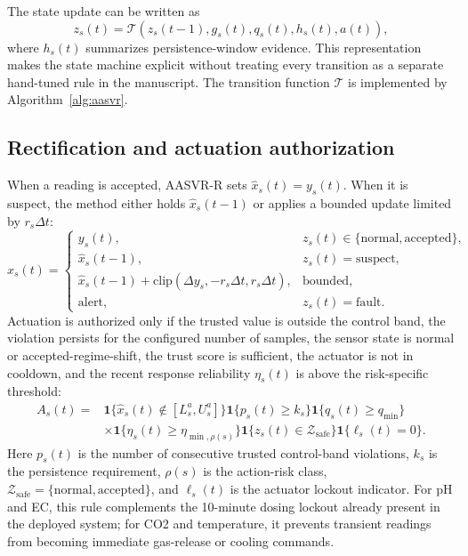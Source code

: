 \documentclass[preprint,12pt,doubleblind]{elsarticle}
\begin{document}
The state update can be written as
\begin{equation}
z_s(t)=\mathcal{T}\left(z_s(t-1),g_s(t),q_s(t),h_s(t),a(t)\right),
\end{equation}
where $h_s(t)$ summarizes persistence-window evidence. This representation makes the state machine explicit without treating every transition as a separate hand-tuned rule in the manuscript. The transition function $\mathcal{T}$ is implemented by Algorithm~\ref{alg:aasvr}.

\subsection{Rectification and actuation authorization}
When a reading is accepted, AASVR-R sets $\hat{x}_s(t)=y_s(t)$. When it is suspect, the method either holds $\hat{x}_s(t-1)$ or applies a bounded update limited by $r_s\Delta t$:
\begin{equation}
\hat{x}_s(t)=
\begin{cases}
y_s(t), & z_s(t)\in\{\mathrm{normal},\mathrm{accepted}\},\\
\hat{x}_s(t-1), & z_s(t)=\mathrm{suspect},\\
\hat{x}_s(t-1)+\mathrm{clip}(\Delta y_s,-r_s\Delta t,r_s\Delta t), & \mathrm{bounded},\\
\mathrm{alert}, & z_s(t)=\mathrm{fault}.
\end{cases}
\label{eq:rectification}
\end{equation}
Actuation is authorized only if the trusted value is outside the control band, the violation persists for the configured number of samples, the sensor state is normal or accepted-regime-shift, the trust score is sufficient, the actuator is not in cooldown, and the recent response reliability $\eta_s(t)$ is above the risk-specific threshold:
\begin{equation}
\begin{aligned}
A_s(t)=&
\mathbf{1}\{\hat{x}_s(t)\notin[L_s^a,U_s^a]\}
\mathbf{1}\{p_s(t)\ge k_s\}
\mathbf{1}\{q_s(t)\ge q_{\min}\}\\
&\times
\mathbf{1}\{\eta_s(t)\ge \eta_{\min,\rho(s)}\}
\mathbf{1}\{z_s(t)\in\mathcal{Z}_{\mathrm{safe}}\}
\mathbf{1}\{\ell_s(t)=0\}.
\end{aligned}
\end{equation}
Here $p_s(t)$ is the number of consecutive trusted control-band violations, $k_s$ is the persistence requirement, $\rho(s)$ is the action-risk class, $\mathcal{Z}_{\mathrm{safe}}=\{\mathrm{normal},\mathrm{accepted}\}$, and $\ell_s(t)$ is the actuator lockout indicator. For pH and EC, this rule complements the 10-minute dosing lockout already present in the deployed system; for CO2 and temperature, it prevents transient readings from becoming immediate gas-release or cooling commands.
\end{document}
